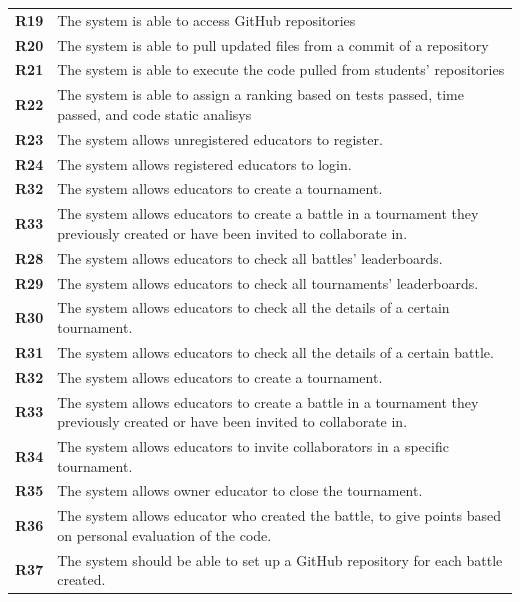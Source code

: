 \documentclass[12pt, a4paper]{report}
\begin{document}
\begin{table}[H]
\begin{tabularx}{\textwidth}{cX}
        \textbf{R19}  & The system is able to access GitHub repositories\\
        \textbf{R20}  & The system is able to pull updated files from a commit of a repository\\
        \textbf{R21}  & The system is able to execute the code pulled from students’ repositories\\
        \textbf{R22}  & The system is able to assign a ranking based on tests passed, time passed, and code static analisys\\
        \textbf{R23} & The system allows unregistered educators to register.                            \\
        \textbf{R24} & The system allows registered educators to login.                                 \\
        \textbf{R32} & The system allows educators to create a tournament.                              \\
        \textbf{R33} & The system allows educators to create a battle in a tournament they
                        previously created or have been invited to collaborate in.\\
        \textbf{R28}  & The system allows educators to check all battles’ leaderboards. \\
        \textbf{R29}  & The system allows educators to check all tournaments’ leaderboards.\\
        \textbf{R30}  & The system allows educators to check all the details of a certain tournament.\\
        \textbf{R31}  & The system allows educators to check all the details of a certain battle.\\
        \textbf{R32}  & The system allows educators to create a tournament.\\
        \textbf{R33}  & The system allows educators to create a battle in a tournament they previously created or have been invited to collaborate in.\\
        \textbf{R34} & The system allows educators to invite collaborators in a specific tournament.    \\
        \textbf{R35}  & The system allows owner educator to close the tournament. \\
        \textbf{R36}  & The system allows educator who created the battle, to give points based on personal evaluation of the code.\\
        \textbf{R37} & The system should be able to set up a GitHub repository for each battle
                        created.\\                                              
        \end{tabularx}
    \end{table}
\end{document}
